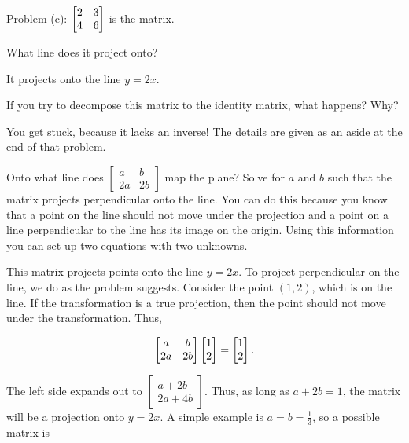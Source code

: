 \documentclass[../gatm_answers.tex]{subfiles}
\begin{document}
\begin{iinner_problem}
\begin{iinner_problem}
\begin{iinner_problem}
Problem (c): $\begin{bmatrix} 2 & 3 \\ 4 & 6 \end{bmatrix}$ is the matrix.

\begin{inner_problem}
\item What line does it project onto?
\end{inner_problem}

It projects onto the line $y=2x$.

\begin{inner_problem}
\item If you try to decompose this matrix to the identity matrix, what happens? Why?
\end{inner_problem}

You get stuck, because it lacks an inverse! The details are given as an aside at the end of that problem.

\begin{outer_problem}
\item Onto what line does $\left[\begin{smallmatrix} a & b \\ 2a & 2b\end{smallmatrix}\right]$ map the plane? Solve for $a$ and $b$ such that the matrix projects perpendicular onto the line. You can do this because you know that a point on the line should not move under the projection and a point on a line perpendicular to the line has its image on the origin. Using this information you can set up two equations with two unknowns. \label{prob:project_the_plane}
\end{outer_problem}

This matrix projects points onto the line $y=2x$. To project perpendicular on the line, we do as the problem suggests. Consider the point $(1,2)$, which is on the line. If the transformation is a true projection, then the point should not move under the transformation. Thus,

$$\begin{bmatrix} a & b \\ 2a & 2b \end{bmatrix}\begin{bmatrix} 1 \\ 2 \end{bmatrix} = \begin{bmatrix} 1 \\ 2 \end{bmatrix}.$$

The left side expands out to $\begin{bmatrix} a+2b \\ 2a+4b \end{bmatrix}$. Thus, as long as $a+2b=1$, the matrix will be a projection onto $y=2x$. A simple example is $a=b=\frac{1}{3}$, so a possible matrix is


\end{iinner_problem}
\end{iinner_problem}
\end{iinner_problem}
\end{document}
